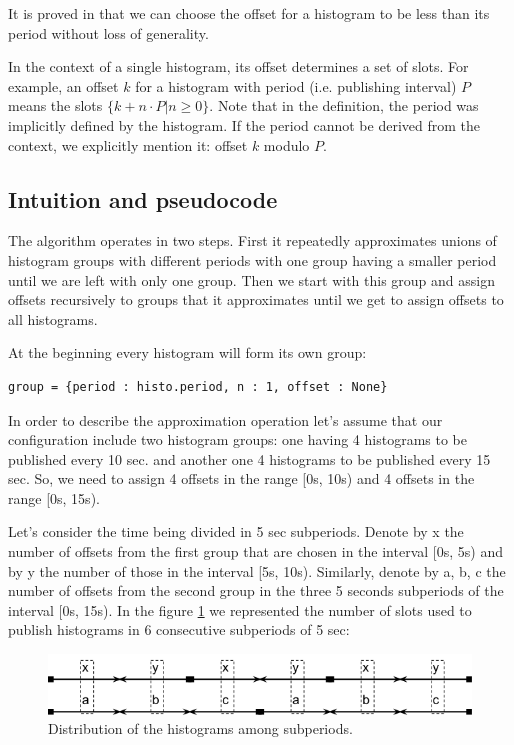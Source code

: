 It is proved in \citep{goossens2003scheduling} that we can choose the offset for a histogram to be less than its period without loss of generality. 

In the context of a single histogram, its offset determines a set of slots. For example, an offset $k$ for a histogram with period (i.e. publishing interval) $P$ means the slots $\{k+n\cdot P | n \geq 0\}$. Note that in the definition, the period was implicitly defined by the histogram. If the period cannot be derived from the context, we explicitly mention it: offset $k$ modulo $P$.

\subsection*{Intuition and pseudocode}

The algorithm operates in two steps. First it repeatedly approximates unions of histogram groups with different periods with one group having a smaller period until we are left with only one group. Then we start with this group and assign offsets recursively to groups that it approximates until we get to assign offsets to all histograms.

At the beginning every histogram will form its own group:
\begin{verbatim}
group = {period : histo.period, n : 1, offset : None}
\end{verbatim}
In order to describe the approximation operation let’s assume that our configuration include two histogram groups: one having 4 histograms to be published every 10 sec. and another one 4 histograms to be published every 15 sec. So, we need to assign 4 offsets in the range [0s, 10s) and 4 offsets in the range [0s, 15s).
 
Let’s consider the time being divided in 5 sec subperiods. Denote by x the number of offsets from the first group that are chosen in the interval [0s, 5s) and by y the number of those in the interval [5s, 10s). Similarly, denote by a, b, c the number of offsets from the second group in the three 5 seconds subperiods of the interval [0s, 15s). In the figure \ref{fig:subperiod} we represented the number of slots used to publish histograms in 6 consecutive subperiods of 5 sec:

\begin{figure}[ht!]
\centering
\includegraphics[scale=0.6]{Images/subperiod.png}
\caption{Distribution of the histograms among subperiods.}
\label{fig:subperiod}
\end{figure}

